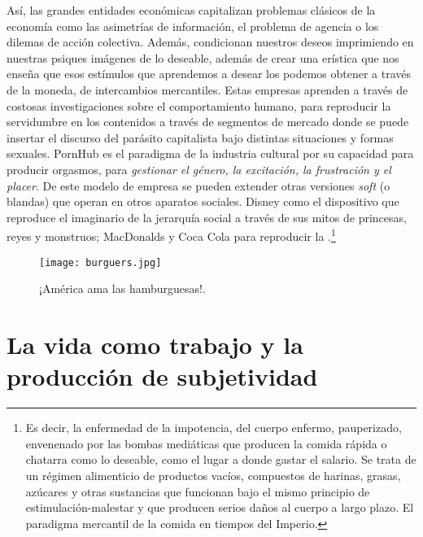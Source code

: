 Así, las grandes entidades económicas capitalizan problemas clásicos de la economía como las asimetrías de información, el problema de agencia o los dilemas de acción colectiva. Además, condicionan nuestros deseos imprimiendo en nuestras psiques imágenes de lo deseable, además de crear una erística que nos enseña que esos estímulos que aprendemos a desear los podemos obtener a través de la moneda, de intercambios mercantiles. Estas empresas aprenden a través de costosas investigaciones sobre el comportamiento humano, para reproducir la servidumbre en los contenidos a través de segmentos de mercado donde se puede insertar el discurso del parásito capitalista bajo distintas situaciones y formas sexuales. PornHub es el paradigma de la industria cultural por su capacidad para producir orgasmos, para \emph{gestionar el género, la excitación, la frustración y el placer}. De este modelo de empresa se pueden extender otras versiones \emph{soft} (o blandas) que operan en otros aparatos sociales. Disney como el dispositivo que reproduce el imaginario de la jerarquía social a través de sus mitos de princesas, reyes y monstruos; MacDonalds y Coca Cola para reproducir la .\footnote{Es decir, la enfermedad de la impotencia, del cuerpo enfermo, pauperizado, envenenado por las bombas mediáticas que producen la comida rápida o chatarra como lo deseable, como el lugar a donde gastar el salario. Se trata de un régimen alimenticio de productos vacíos, compuestos de harinas, grasas, azúcares y otras sustancias que funcionan bajo el mismo principio de estimulación-malestar y que producen serios daños al cuerpo a largo plazo. El paradigma mercantil de la comida en tiempos del Imperio.}

\begin{figure}[htbp]
	\centering
	\texttt{[image: burguers.jpg]}
	\caption{¡América ama las hamburguesas!.}
	\label{fig:burger}
\end{figure}

\section{La vida como trabajo y la producción de subjetividad}
\label{sec:subjetividad}

